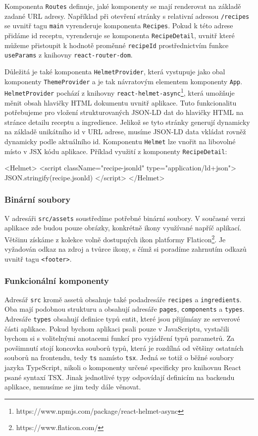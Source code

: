 Komponenta \texttt{Routes} definuje, jaké komponenty se mají renderovat na základě zadané URL adresy. Například při otevření stránky s relativní adresou \texttt{/recipes} se uvnitř tagu \texttt{main} vyrenderuje komponenta \texttt{Recipes}. Pokud k této adrese přidáme id receptu, vyrenderuje se komponenta \texttt{RecipeDetail}, uvnitř které můžeme přistoupit k hodnotě proměnné \texttt{recipeId} prostřednictvím funkce \texttt{useParams} z knihovny \texttt{react-router-dom}.

Důležitá je také komponenta \texttt{HelmetProvider}, která vystupuje jako obal komponenty \texttt{ThemeProvider} a je tak návratovým elementem komponenty \texttt{App}. \texttt{HelmetProvider} pochází z knihovny \texttt{react-helmet-async}\footnote{https://www.npmjs.com/package/react-helmet-async}, která umožňuje měnit obsah hlavičky HTML dokumentu uvnitř aplikace. Tuto funkcionalitu potřebujeme pro vložení strukturovaných JSON-LD dat do hlavičky HTML na stránce detailu receptu a ingredience. Jelikož se tyto stránky generují dynamicky na základě unikátního id v URL adrese, musíme JSON-LD data vkládat rovněž dynamicky podle aktuálního id. Komponentu \texttt{Helmet} lze vnořit na libovolné místo v JSX kódu aplikace. Příklad využití z komponenty \texttt{RecipeDetail}:

\begingroup
\samepage
\begin{code}
<Helmet>
  <script className="recipe-jsonld" type="application/ld+json">
    {JSON.stringify(recipe.jsonld)}
  </script>
</Helmet>
\end{code}
\endgroup

\subsubsection{Binární soubory}

V adresáři \texttt{src/assets} soustředíme potřebné binární soubory. V současné verzi aplikace zde budou pouze obrázky, konkrétně ikony využívané napříč aplikací. Většinu získáme z kolekce volně dostupných ikon platformy Flaticon\footnote{https://www.flaticon.com/}. Je vyžadován odkaz na zdroj a tvůrce ikony, s čímž si poradíme zahrnutím odkazů uvnitř tagu \texttt{<footer>}.

\subsubsection{Funkcionální komponenty}

Adresář \texttt{src} kromě assetů obsahuje také podadresáře \texttt{recipes} a \texttt{ingredients}. Oba mají podobnou strukturu a obsahují adresáře \texttt{pages}, \texttt{components} a \texttt{types}. Adresáře \texttt{types} obsahují definice typů entit, které jsou přijímány ze serverové části aplikace. Pokud bychom aplikaci psali pouze v JavaScriptu, vystačili bychom si s volitelnými anotacemi funkcí pro vyjádření typů parametrů. Za povšimnutí stojí koncovka souborů typů, která je rozdílná od většiny ostatních souborů na frontendu, tedy \texttt{ts} namísto \texttt{tsx}. Jedná se totiž o běžné soubory jazyka TypeScript, nikoli o komponenty určené specificky pro knihovnu React psané syntaxí TSX. Jinak jednotlivé typy odpovídají definicím na backendu aplikace, nemusíme se jim tedy dále věnovat.

